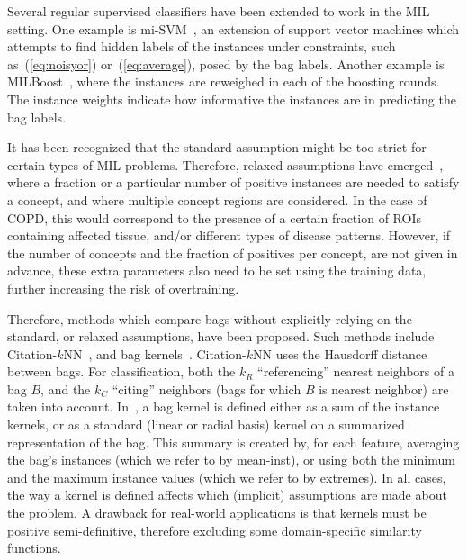 \documentclass[10pt,conference,a4paper]{IEEEtran}
\begin{document}
Several regular supervised classifiers have been extended to work in the MIL setting. One example is mi-SVM~\cite{andrews2002support}, an extension of support vector machines which attempts to find hidden labels of the instances under constraints, such as~(\ref{eq:noisyor}) or~(\ref{eq:average}), posed by the bag labels. Another example is MILBoost~\cite{viola2006multiple}, where the instances are reweighed in each of the boosting rounds. The instance weights indicate how informative the instances are in predicting the bag labels.

It has been recognized that the standard assumption might be too strict for certain types of MIL problems. Therefore, relaxed assumptions have emerged~\cite{weidmann2003two}, where a fraction or a particular number of positive instances are needed to satisfy a concept, and where multiple concept regions are considered. In the case of COPD, this would correspond to the presence of a certain fraction of ROIs containing affected tissue, and/or different types of disease patterns. However, if the number of concepts and the fraction of positives per concept, are not given in advance, these extra parameters also need to be set using the training data, further increasing the risk of overtraining.

Therefore, methods which compare bags without explicitly relying on the standard, or relaxed assumptions, have been proposed. Such methods include Citation-$k$NN~\cite{wang2000solving}, and bag kernels~\cite{gartner2002multi}. Citation-$k$NN uses the Hausdorff distance between bags. For classification, both the $k_R$ ``referencing'' nearest neighbors of a bag $B$, and the $k_C$ ``citing'' neighbors (bags for which $B$ is nearest neighbor) are taken into account.
In~\cite{gartner2002multi}, a bag kernel is defined either as a sum of the instance kernels, or as a standard (linear or radial basis) kernel on a summarized representation of the bag. This summary is created by, for each feature, averaging the bag's instances (which we refer to by mean-inst), or using both the minimum and the maximum instance values (which we refer to by extremes). In all cases, the way a kernel is defined affects which (implicit) assumptions are made about the problem. A drawback for real-world applications is that kernels must be positive semi-definitive, therefore excluding some domain-specific similarity functions.
\end{document}

